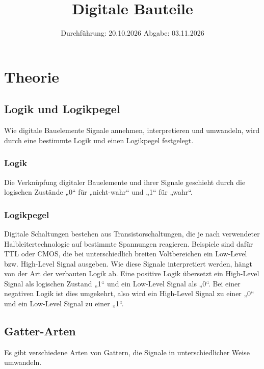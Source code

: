 


\subject{VERSUCH 350}
\title{Digitale Bauteile}
\date{
  Durchführung: 20.10.2026
  \hspace{3em}
  Abgabe: 03.11.2026
}
\usepackage{subcaption}
\usepackage[section, below]{placeins}
\usepackage[]{caption} %
\FloatBarrier
\usepackage{comment}



\maketitle
\thispagestyle{empty}
\tableofcontents
\newpage
%
%
%
%
\section{Theorie}
\subsection{Logik und Logikpegel}
Wie digitale Bauelemente Signale annehmen, interpretieren und umwandeln, wird durch eine bestimmte Logik und einen Logikpegel festgelegt.
\subsubsection{Logik}
    Die Verknüpfung digitaler Bauelemente und ihrer Signale 
    geschieht durch die logischen Zustände „0“ für „nicht-wahr“ und „1“ für „wahr“.
  \subsubsection{Logikpegel}
    Digitale Schaltungen bestehen aus Transistorschaltungen,
    die je nach verwendeter Halbleitertechnologie auf bestimmte Spannungen reagieren. 
    Beispiele sind dafür TTL oder CMOS, 
    die bei unterschiedlich breiten Voltbereichen ein Low-Level 
    bzw. High-Level Signal ausgeben. 
    Wie diese Signale interpretiert werden,   
    hängt von der Art der verbauten Logik ab. 
    Eine positive Logik übersetzt ein High-Level Signal als 
    logischen Zustand „1“ und ein Low-Level Signal als „0“.
    Bei einer negativen Logik ist dies umgekehrt, 
    also wird ein High-Level Signal zu einer „0“ 
    und ein Low-Level Signal zu einer „1“. \cite{digbau}
\subsection{Gatter-Arten}
  Es gibt verschiedene Arten von Gattern, 
  die Signale in unterschiedlicher Weise umwandeln.\cite{digbau}
